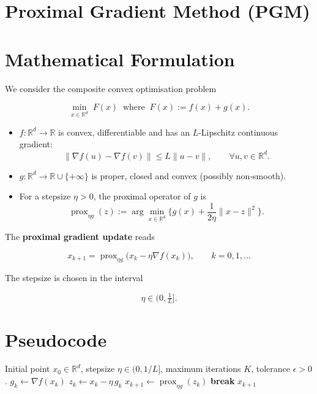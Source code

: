 \documentclass{article}
\newcommand{\prox}{\operatorname{prox}}
\newcommand{\R}{\mathbb{R}}
\begin{document}
\section*{Proximal Gradient Method (PGM)}

\section*{Mathematical Formulation}
We consider the composite convex optimisation problem  

\[
\min_{x\in\R^{d}} \; F(x)\;\; \text{where}\;\; F(x):=f(x)+g(x).
\]

\begin{itemize}
\item $f:\R^{d}\rightarrow\R$ is convex, differentiable and has an $L$‑Lipschitz continuous gradient:
\[
\|\nabla f(u)-\nabla f(v)\|\le L\|u-v\|,\qquad\forall u,v\in\R^{d}.
\]
\item $g:\R^{d}\rightarrow\R\cup\{+\infty\}$ is proper, closed and convex (possibly non‑smooth).
\item For a stepsize $\eta>0$, the proximal operator of $g$ is
\[
\prox_{\eta g}(z):=\arg\min_{x\in\R^{d}}\Big\{ g(x)+\frac{1}{2\eta}\|x-z\|^{2}\Big\}.
\]
\end{itemize}

The \textbf{proximal gradient update} reads  

\[
\boxed{
x_{k+1}= \prox_{\eta g}\bigl(x_{k}-\eta\nabla f(x_{k})\bigr)},\qquad k=0,1,\dots
\tag{1}
\]

The stepsize is chosen in the interval  

\[
\eta\in\bigl(0,\tfrac{1}{L}\bigr].
\tag{2}
\]

\section*{Pseudocode}
\begin{algorithm}[H]
\caption{Proximal Gradient Method}
\begin{algorithmic}[1]
\Require Initial point $x_{0}\in\R^{d}$, stepsize $\eta\in(0,1/L]$, 
maximum iterations $K$, tolerance $\epsilon>0$.
    \State $g_{k}\gets \nabla f(x_{k})$ 
    \State $z_{k}\gets x_{k}-\eta\,g_{k}$ 
    \State $x_{k+1}\gets \prox_{\eta g}(z_{k})$ 
        \State \textbf{break}
    \EndIf
\EndFor
\State \Return $x_{k+1}$
\end{algorithmic}
\end{algorithm}
\end{document}
